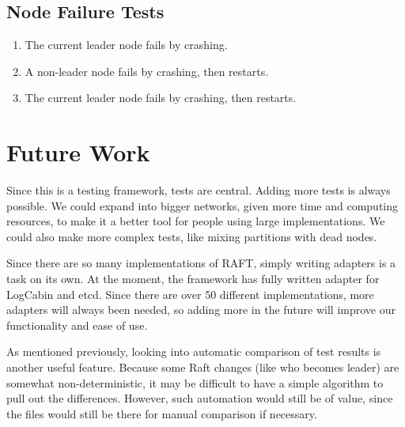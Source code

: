 \documentclass[UTF8]{article}
\begin{document}
\subsection{Node Failure Tests}
\begin{enumerate}
  \item The current leader node fails by crashing.
  \item A non-leader node fails by crashing, then restarts.
  \item The current leader node fails by crashing, then restarts. 
\end{enumerate}

\section{Future Work}
Since this is a testing framework, tests are central. Adding more tests is always possible. We could expand into bigger networks, given more time and computing resources, to make it a better tool for people using large implementations. We could also make more complex tests, like mixing partitions with dead nodes.

Since there are so many implementations of RAFT, simply writing adapters is a task on its own. At the moment, the framework has fully written adapter for LogCabin and etcd. Since there are over 50 different implementations, more adapters will always been needed, so adding more in the future will improve our functionality and ease of use.

As mentioned previously, looking into automatic comparison of test results is another useful feature. Because some Raft changes (like who becomes leader) are somewhat non-deterministic, it may be difficult to have a simple algorithm to pull out the differences. However, such automation would still be of value, since the files would still be there for manual comparison if necessary.





\end{document}
